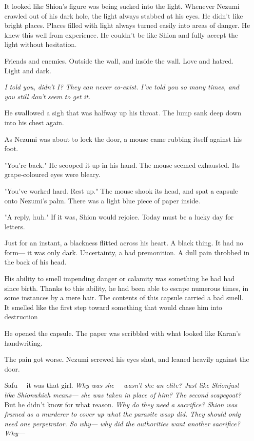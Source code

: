 \mybreak

It looked like Shion's figure was being sucked into the light. Whenever
Nezumi crawled out of his dark hole, the light always stabbed at his
eyes. He didn't like bright places. Places filled with light always
turned easily into areas of danger. He knew this well from experience.
He couldn't be like Shion and fully accept the light without hesitation.

Friends and enemies. Outside the wall, and inside the wall. Love and
hatred. Light and dark.

\emph{I told you, didn't I? They can never co-exist. I've told you so many
times, and you still don't seem to get it.}

He swallowed a sigh that was halfway up his throat. The lump sank deep
down into his chest again.

As Nezumi was about to lock the door, a mouse came rubbing itself
against his foot.

"You're back." He scooped it up in his hand. The mouse seemed exhausted.
Its grape-coloured eyes were bleary.

"You've worked hard. Rest up." The mouse shook its head, and spat a
capsule onto Nezumi's palm. There was a light blue piece of paper
inside.

"A reply, huh." If it was, Shion would rejoice. Today must be a lucky
day for letters.

Just for an instant, a blackness flitted across his heart. A black
thing. It had no form--- it was only dark. Uncertainty, a bad premonition.
A dull pain throbbed in the back of his head.

His ability to smell impending danger or calamity was something he had
had since birth. Thanks to this ability, he had been able to escape
numerous times, in some instances by a mere hair. The contents of this
capsule carried a bad smell. It smelled like the first step toward
something that would chase him into destruction\el 

He opened the capsule. The paper was scribbled with what looked like
Karan's handwriting.


The pain got worse. Nezumi screwed his eyes shut, and leaned heavily
against the door.

Safu--- it was that girl. \emph{Why was she--- wasn't she an elite? Just like
Shion\el just like Shion\el which means--- she was taken in place of him?
The second scapegoat?} But he didn't know for what reason. \emph{Why do they
need a sacrifice? Shion was framed as a murderer to cover up what the
parasite wasp did. They should only need one perpetrator. So why--- why
did the authorities want another sacrifice? Why---}

